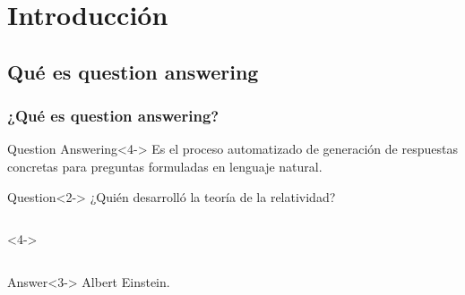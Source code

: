 \section{Introducción}

\subsection{Qué es question answering}

\begin{frame}
  \frametitle{¿Qué es question answering?}
  \begin{block}{Question Answering}<4->
      Es el proceso automatizado de generación de respuestas concretas para preguntas formuladas en lenguaje natural.
  \end{block}
  \bigskip

 \begin{alertblock}{Question}<2->
      ¿Quién desarrolló la teoría de la relatividad?
  \end{alertblock}

  \begin{columns}<4->
      \begin{column}{.5\textwidth}
      \end{column}
      \begin{column}{.1\textwidth}
      \end{column}
      \begin{column}{.3\textwidth}
      \end{column}
      \begin{column}{.5\textwidth}

      \end{column}
  \end{columns}

  \begin{exampleblock}{Answer}<3->
      Albert Einstein.
  \end{exampleblock}
\end{frame}

